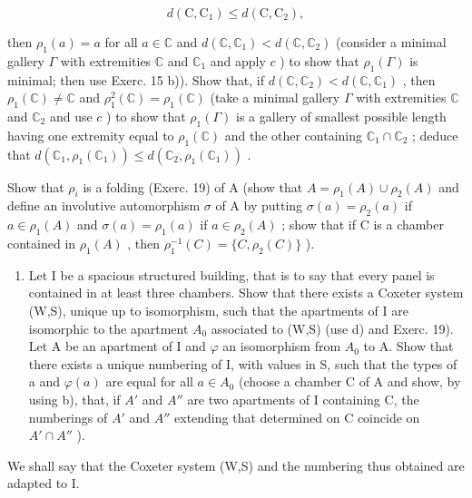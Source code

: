 \[
d (\mathrm{C}, \mathrm{C} _ {1}) \leqslant d (\mathrm{C}, \mathrm{C} _ {2}),
\]

then \(\rho_{1}(a) = a\) for all \(a \in \mathbb{C}\) and \(d(\mathbb{C}, \mathbb{C}_{1}) < d(\mathbb{C}, \mathbb{C}_{2})\) (consider a minimal gallery \(\Gamma\) with extremities \(\mathbb{C}\) and \(\mathbb{C}_{1}\) and apply \(c\) ) to show that \(\rho_{1}(\Gamma)\) is minimal; then use Exerc. 15 b)). Show that, if \(d(\mathbb{C}, \mathbb{C}_{2}) < d(\mathbb{C}, \mathbb{C}_{1})\) , then \(\rho_{1}(\mathbb{C}) \neq \mathbb{C}\) and \(\rho_{1}^{2}(\mathbb{C}) = \rho_{1}(\mathbb{C})\) (take a minimal gallery \(\Gamma\) with extremities \(\mathbb{C}\) and \(\mathbb{C}_{2}\) and use \(c\) ) to show that \(\rho_{1}(\Gamma)\) is a gallery of smallest possible length having one extremity equal to \(\rho_{1}(\mathbb{C})\) and the other containing \(\mathbb{C}_{1} \cap \mathbb{C}_{2}\) ; deduce that \(d(\mathbb{C}_{1}, \rho_{1}(\mathbb{C}_{1})) \leqslant d(\mathbb{C}_{2}, \rho_{1}(\mathbb{C}_{1}))\) .

Show that \(\rho_{i}\) is a folding (Exerc. 19) of A (show that \(A = \rho_{1}(A) \cup \rho_{2}(A)\) and define an involutive automorphism \(\sigma\) of A by putting \(\sigma(a) = \rho_{2}(a)\) if \(a \in \rho_{1}(A)\) and \(\sigma(a) = \rho_{1}(a)\) if \(a \in \rho_{2}(A)\) ; show that if C is a chamber contained in \(\rho_{1}(A)\) , then \(\rho_{1}^{-1}(C) = \{C, \rho_{2}(C)\}\) ).

\begin{enumerate}
\def\labelenumi{\alph{enumi})}
\setcounter{enumi}{4}
\tightlist
\item
  Let I be a spacious structured building, that is to say that every panel is contained in at least three chambers. Show that there exists a Coxeter system (W,S), unique up to isomorphism, such that the apartments of I are isomorphic to the apartment \(A_{0}\) associated to (W,S) (use d) and Exerc. 19). Let A be an apartment of I and \(\varphi\) an isomorphism from \(A_{0}\) to A. Show that there exists a unique numbering of I, with values in S, such that the types of a and \(\varphi(a)\) are equal for all \(a \in A_{0}\) (choose a chamber C of A and show, by using b), that, if \(A'\) and \(A''\) are two apartments of I containing C, the numberings of \(A'\) and \(A''\) extending that determined on C coincide on \(A' \cap A''\) ).
\end{enumerate}

We shall say that the Coxeter system (W,S) and the numbering thus obtained are adapted to I.

